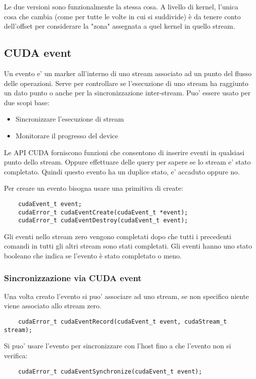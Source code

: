 Le due versioni sono funzionalmente la stessa cosa. A livello di kernel, l'unica cosa che cambia (come per tutte le volte in cui si suddivide) è da tenere conto dell'offset per considerare la "zona" assegnata a quel kernel in quello stream.

\subsection{CUDA event}
Un evento e' un marker all'interno di uno stream associato ad un punto del flusso delle operazioni. Serve per controllare se l'esecuzione di uno stream ha raggiunto un dato punto o anche per la sincronizzazione inter-stream.
Puo' essere usato per due scopi base:
\begin{itemize}
    \item Sincronizzare l'esecuzione di stream
    \item Monitorare il progresso del device
\end{itemize}

Le API CUDA forniscono funzioni che consentono di inserire eventi in qualsiasi punto dello stream. Oppure effettuare delle query per sapere se lo stream e' stato completato. Quindi questo evento ha un duplice stato, e' accaduto oppure no.

Per creare un evento bisogna usare una primitiva di create:
\begin{lstlisting}
    cudaEvent_t event;
    cudaError_t cudaEventCreate(cudaEvent_t *event);
    cudaError_t cudaEventDestroy(cudaEvent_t event);
\end{lstlisting}
Gli eventi nello stream zero vengono completati dopo che tutti i precedenti comandi in tutti gli altri stream sono stati completati.
Gli eventi hanno uno stato booleano che indica se l'evento è stato completato o meno.

\subsubsection{Sincronizzazione via CUDA event}
Una volta creato l'evento si puo' associare ad uno stream, se non specifico niente viene associato allo stream zero.
\begin{lstlisting}
    cudaError_t cudaEventRecord(cudaEvent_t event, cudaStream_t stream);
\end{lstlisting}

Si puo' usare l'evento per sincronizzare con l'host fino a che l'evento non si verifica:
\begin{lstlisting}
    cudaError_t cudaEventSynchronize(cudaEvent_t event);
\end{lstlisting}


